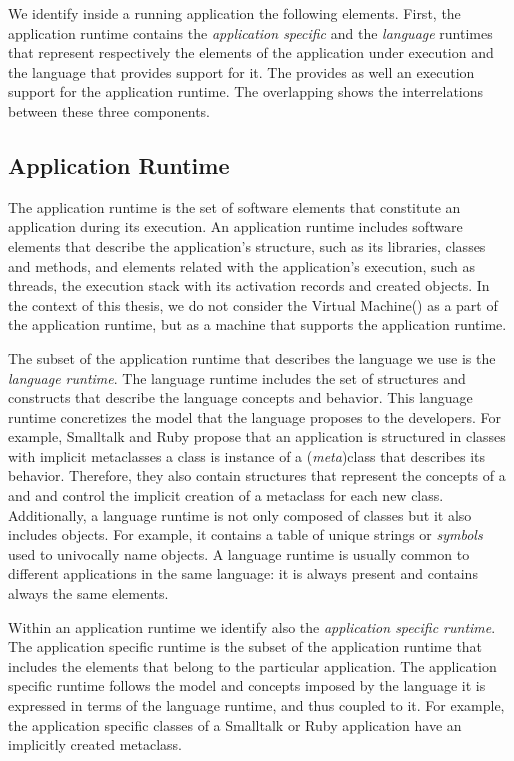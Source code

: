 We identify inside a running application the following elements. First, the application runtime contains the \emph{application specific} and the \emph{language} runtimes that represent respectively the elements of the application under execution and the language that provides support for it. The \VM provides as well an execution support for the application runtime. The overlapping shows the interrelations between these three components.

\subsection{Application Runtime}

The application runtime is the set of software elements that constitute an application during its execution. An application runtime includes software elements that describe the application's structure, such as its libraries, classes and methods, and elements related with the application's execution, such as threads, the execution stack with its activation records and created objects. In the context of this thesis, we do not consider the Virtual Machine(\VM) as a part of the application runtime, but as a machine that supports the application runtime.

The subset of the application runtime that describes the language we use is the \emph{language runtime}. The language runtime includes the set of structures and constructs that describe the language concepts and behavior. This language runtime concretizes the model that the language proposes to the developers. For example, Smalltalk and Ruby propose that an application is structured in classes with implicit metaclasses \ie a class is instance of a (\emph{meta})class that describes its behavior. Therefore, they also contain structures that represent the concepts of a  and  and control the implicit creation of a metaclass for each new class. Additionally, a language runtime is not only composed of classes but it also includes objects. For example, it contains a table of unique strings or \emph{symbols} used to univocally name objects. A language runtime is usually common to different applications in the same language: it is always present and contains always the same elements.

Within an application runtime we identify also the \emph{application specific runtime}. The application specific runtime is the subset of the application runtime that includes the elements that belong to the particular application. The application specific runtime follows the model and concepts imposed by the language \ie it is expressed in terms of the language runtime, and thus coupled to it. For example, the application specific classes of a Smalltalk or Ruby application have an implicitly created metaclass.

